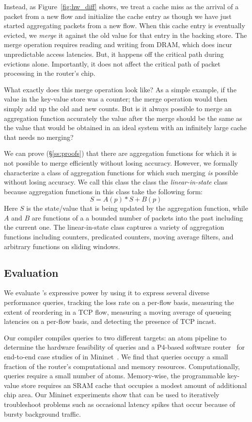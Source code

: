 Instead, as Figure~\ref{fig:hw_diff} shows, we treat a cache miss as the
arrival of a packet from a new flow and initialize the cache entry as though we
have just started aggregating packets from a new flow. When this cache entry is
eventually evicted, we {\em merge} it against the old value for that entry in the
backing store. The merge operation requires reading and writing from DRAM, which does
incur unpredictable access latencies. But, it happens off the critical path
during evictions alone. Importantly, it does not affect the critical path of
packet processing in the router's chip.

What exactly does this merge operation look like? As a simple example, if the
value in the key-value store was a counter; the merge operation would then
simply add up the old and new counts.  But is it always possible to merge an
aggregation function accurately \ie the value after the merge should be the
same as the value that would be obtained in an ideal system with an infinitely
large cache that needs no merging?

We can prove (\S\ref{ss:proofs}) that there are aggregation functions for which
it is not possible to merge efficiently without losing accuracy. However, we
formally characterize a class of aggregation functions for which such merging
{\em is} possible without losing accuracy. We call this class the class the
{\em linear-in-state} class because aggregation functions in this class take
the following form:
\begin{equation}
S = A(p) * S + B(p)
\end{equation}
Here $S$ is the state/value that is being updated by the aggregation function,
while $A$ and $B$ are functions of a a bounded number of packets into the past
including the current one. The linear-in-state class captures a variety of
aggregation functions including counters, predicated counters, moving average
filters, and arbitrary functions on sliding windows.

\subsection{Evaluation} We evaluate \TheSystem's expressive power by using it
to express several diverse performance queries, \eg tracking the loss rate on a
per-flow basis, measuring the extent of reordering in a TCP flow, measuring a
moving average of queueing latencies on a per-flow basis, and detecting the
presence of TCP incast.

Our \TheSystem compiler compiles queries to two different targets: an atom
pipeline to determine the hardware feasibility of \TheSystem queries and a
P4-based software router~\cite{p4-bmv2} for end-to-end case studies of
\TheSystem in Mininet~\cite{mininet}. We find that \TheSystem queries occupy a
small fraction of the router's computational and memory resources.
Computationally, queries require a small number of atoms. Memory-wise, the
programmable key-value store requires an SRAM cache that occupies a modest
amount of additional chip area. Our Mininet experiments show that \TheSystem
can be used to iteratively troubleshoot problems such as occasional latency
spikes that occur because of bursty background traffic.

